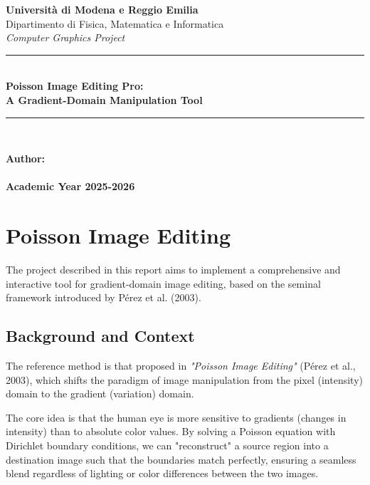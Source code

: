 \documentclass[12pt,a4paper]{report}
\begin{document}
\begin{titlepage}
    \centering
    {\large \textbf{Università di Modena e Reggio Emilia}} \\
    {\large Dipartimento di Fisica, Matematica e Informatica} \\
    \vspace{2cm}
    {\Large \textit{Computer Graphics Project}} \\
    \vspace{1.5cm}
    \rule{\linewidth}{0.5mm} \\[0.4cm]
    {\huge \textbf{Poisson Image Editing Pro: \\ A Gradient-Domain Manipulation Tool}} \\[0.4cm]
    \rule{\linewidth}{0.5mm} \\
    \vspace{3cm}
    
    \begin{flushright}
        \large
        \textbf{Author:} \\
        [Your Name Here] \\
        \vspace{1cm}
        \textbf{Academic Year 2025-2026}
    \end{flushright}
\end{titlepage}

\tableofcontents
\newpage

\chapter{Poisson Image Editing}

The project described in this report aims to implement a comprehensive and interactive tool for gradient-domain image editing, based on the seminal framework introduced by Pérez et al. (2003).

\section{Background and Context}
The reference method is that proposed in \textit{"Poisson Image Editing"} (Pérez et al., 2003), which shifts the paradigm of image manipulation from the pixel (intensity) domain to the gradient (variation) domain. 

The core idea is that the human eye is more sensitive to gradients (changes in intensity) than to absolute color values. By solving a Poisson equation with Dirichlet boundary conditions, we can "reconstruct" a source region into a destination image such that the boundaries match perfectly, ensuring a seamless blend regardless of lighting or color differences between the two images.
\end{document}
